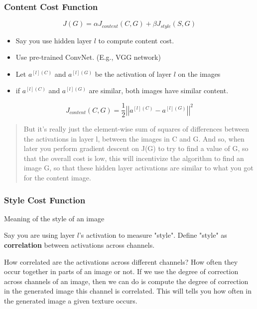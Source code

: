 \subsubsection{Content Cost Function}

\begin{equation}
    J(G) = \alpha J_{content} (C, G) + \beta J_{style} (S, G)
\end{equation}

\begin{itemize}
    \item Say you use hidden layer $l$ to compute content cost. 
    \item Use pre-trained ConvNet. (E.g., VGG network)
    \item Let $a^{[l](C)}$ and $a^{[l](G)}$ be the activation of layer $l$ on the images   
    \item if $a^{[l](C)}$  and $a^{[l](G)}$ are similar, both images have similar content.
\end{itemize}
\begin{equation}
J_{content}(C, G) = \frac{1}{2} \left|\left| a^{[l](C)} - a^{[l](G)} \right|\right|^2
\end{equation}

\begin{quote}
     But it's really just the element-wise sum of squares of differences between the activations in layer l, between the images in C and G. And so, when later you perform gradient descent on J(G) to try to find a value of G, so that the overall cost is low, this will incentivize the algorithm to find an image G, so that these hidden layer activations are similar to what you got for the content image.
\end{quote}

\subsubsection{Style Cost Function}
Meaning of the style of an image

Say you are using layer $l$'s activation to measure "style". Define "style" as \textbf{correlation} between activations across channels.

How correlated are the activations across different channels? How often they occur together in parts of an image or not. If we use the degree of correction across channels of an image, then we can do is compute the degree of correction in the generated image this channel is correlated. This will tells you how often in the generated image a given texture occurs.

